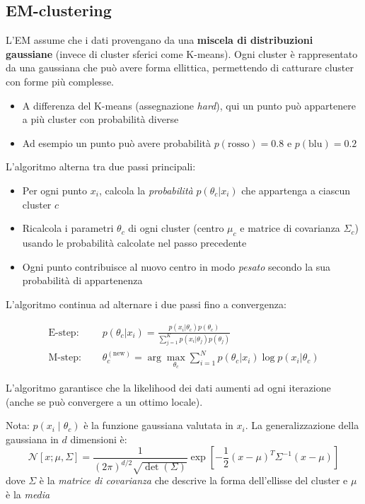 \subsection{EM-clustering}
L'EM assume che i dati provengano da una \textbf{miscela di distribuzioni gaussiane} (invece di cluster sferici come K-means). Ogni cluster è rappresentato da una gaussiana che può avere forma ellittica, permettendo di catturare cluster con forme più complesse.

\begin{itemize}
	\item A differenza del K-means (assegnazione \textit{hard}), qui un punto può appartenere a più cluster con probabilità diverse
	\item Ad esempio un punto può avere probabilità $p(\text{rosso}) = 0.8$ e $p(\text{blu}) = 0.2$
\end{itemize}

\vskip3mm
L'algoritmo alterna tra due passi principali:
\begin{itemize}
	\item Per ogni punto $x_i$, calcola la \textit{probabilità} $p(\theta_c | x_i)$ che appartenga a ciascun cluster $c$
	\item Ricalcola i parametri $\theta_c$ di ogni cluster (centro $\mu_c$ e matrice di covarianza $\Sigma_c$) usando le probabilità calcolate nel passo precedente
	\item Ogni punto contribuisce al nuovo centro in modo \textit{pesato} secondo la sua probabilità di appartenenza
\end{itemize}




L'algoritmo continua ad alternare i due passi fino a convergenza:

\begin{align}
	\text{E-step: } & \quad p(\theta_c | x_i) = \frac{p(x_i | \theta_c) p(\theta_c)}{\sum_{j=1}^{K} p(x_i | \theta_j) p(\theta_j)}                              \\[0.5em]
	\text{M-step: } & \quad \theta_c^{(\text{new})} = \arg\max_{\theta_c} \sum_{i=1}^{N} p(\theta_c | x_i) \log p(x_i | \theta_c) \label{em-clustering-formule}
\end{align}

L'algoritmo garantisce che la likelihood dei dati aumenti ad ogni iterazione (anche se può convergere a un ottimo locale).

\vskip3mm
Nota: $ p\left(x_i \mid \theta_c\right) $ è la funzione gaussiana valutata in $ x_i $. La generalizzazione della gaussiana in $ d $ dimensioni è:
\[
	\mathcal{N}[x; \mu, \Sigma] = \frac{1}{(2\pi)^{d/2} \sqrt{\det(\Sigma)}} \exp\left[-\frac{1}{2}(x - \mu)^T \Sigma^{-1} (x - \mu)\right]
\]
dove $ \Sigma  $ è la \textit{matrice di covarianza} che descrive la forma dell'ellisse del cluster e $ \mu  $ è la \textit{media}

